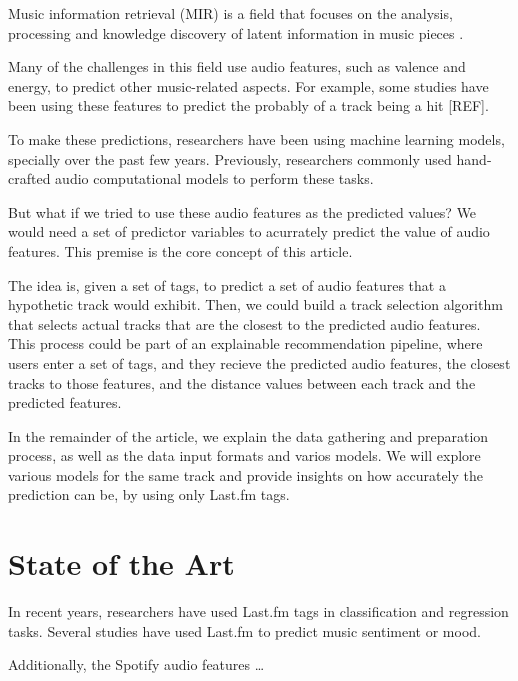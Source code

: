 \documentclass[sn-mathphys]{sn-jnl}%
\theoremstyle{thmstyleone}%
\theoremstyle{thmstyletwo}%
\theoremstyle{thmstylethree}%
\begin{document}
Music information retrieval (MIR) is a field that focuses on the analysis,
processing and knowledge discovery of latent information in music pieces \cite{ramirez2020machine}.

Many of the challenges in this field use audio features, such as valence and energy, to predict other music-related aspects.
For example, some studies have been using these features to predict the probably of a track being a hit [REF].

To make these predictions, researchers have been using machine learning models, specially over the past few years.
Previously, researchers commonly used hand-crafted audio computational models to perform these tasks.

But what if we tried to use these audio features as the predicted values? We would need a set of predictor variables to
acurrately predict the value of audio features.
This premise is the core concept of this article.

The idea is, given a set of tags, to predict a set of audio features that a hypothetic track would exhibit.
Then, we could build a track selection algorithm that selects actual tracks that are the closest to the predicted audio features.
This process could be part of an explainable recommendation pipeline, where users enter a set of tags, and they recieve the predicted audio features, the closest tracks to those features, and the distance values between each track and the predicted features.

In the remainder of the article, we explain the data gathering and preparation process, as well as the data input formats and varios models.
We will explore various models for the same track and provide insights on how accurately the prediction can be, by using only Last.fm tags.

\section{State of the Art}

In recent years, researchers have used Last.fm tags in classification and regression tasks.
Several studies have used Last.fm to predict music sentiment or mood.




Additionally, the Spotify audio features \dots 
\end{document}

